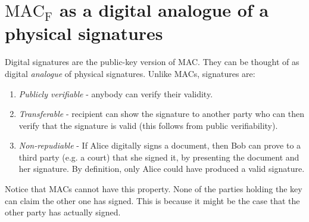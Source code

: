 \documentclass{article}
\begin{document}
\section{$\operatorname{MAC_F}$ as a digital analogue of a physical signatures}
Digital signatures are the public-key version of MAC. They can be thought of as digital \textit{analogue} of physical signatures. Unlike MACs, signatures are:
\begin{enumerate}
    \item \textit{Publicly verifiable} - anybody can verify their validity.
    \item \textit{Transferable} - recipient can show the signature to another party who can then verify that the signature is valid (this follows from public verifiability).
    \item \textit{Non-repudiable} - If Alice digitally signs a document, then Bob can prove to a third party (e.g. a court) that she signed it, by presenting the document and her signature. By definition, only Alice could have produced a valid signature.
\end{enumerate}
Notice that MACs cannot have this property. None of the parties holding the key can claim the other one has signed. This is because it might be the case that the other party has actually signed. 
\end{document}
